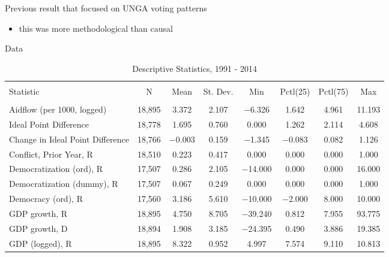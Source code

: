 \documentclass[ignorenonframetext,]{beamer}
\providecommand{\tightlist}{%
  \setlength{\itemsep}{0pt}\setlength{\parskip}{0pt}}
\begin{document}
\begin{frame}{Previous result that focused on UNGA voting patterns}
\protect\hypertarget{previous-result-that-focused-on-unga-voting-patterns}{}

\begin{itemize}
\tightlist
\item
  this was more methodological than causal
\end{itemize}

\end{frame}

\begin{frame}{Data}
\protect\hypertarget{data}{}

\begin{table}[!htbp] \centering 
  \caption{Descriptive Statistics, 1991 - 2014} 
  \label{} 
\begin{tabular}{@{\extracolsep{5pt}}lccccccc} 
\\[-1.8ex]\hline 
\hline \\[-1.8ex] 
Statistic & \multicolumn{1}{c}{N} & \multicolumn{1}{c}{Mean} & \multicolumn{1}{c}{St. Dev.} & \multicolumn{1}{c}{Min} & \multicolumn{1}{c}{Pctl(25)} & \multicolumn{1}{c}{Pctl(75)} & \multicolumn{1}{c}{Max} \\ 
\hline \\[-1.8ex] 
Aidflow (per 1000, logged) & 18,895 & 3.372 & 2.107 & $-$6.326 & 1.642 & 4.961 & 11.193 \\ 
Ideal Point Difference & 18,778 & 1.695 & 0.760 & 0.000 & 1.262 & 2.114 & 4.608 \\ 
Change in Ideal Point Difference & 18,766 & $-$0.003 & 0.159 & $-$1.345 & $-$0.083 & 0.082 & 1.126 \\ 
Conflict, Prior Year, R & 18,510 & 0.223 & 0.417 & 0.000 & 0.000 & 0.000 & 1.000 \\ 
Democratization (ord), R & 17,507 & 0.286 & 2.105 & $-$14.000 & 0.000 & 0.000 & 16.000 \\ 
Democratization (dummy), R & 17,507 & 0.067 & 0.249 & 0.000 & 0.000 & 0.000 & 1.000 \\ 
Democracy (ord), R & 17,560 & 3.186 & 5.610 & $-$10.000 & $-$2.000 & 8.000 & 10.000 \\ 
GDP growth, R & 18,895 & 4.750 & 8.705 & $-$39.240 & 0.812 & 7.955 & 93.775 \\ 
GDP growth, D & 18,894 & 1.908 & 3.185 & $-$24.395 & 0.490 & 3.886 & 19.385 \\ 
GDP (logged), R & 18,895 & 8.322 & 0.952 & 4.997 & 7.574 & 9.110 & 10.813 \\ 

\end{tabular}
\end{table}
\end{frame}
\end{document}
